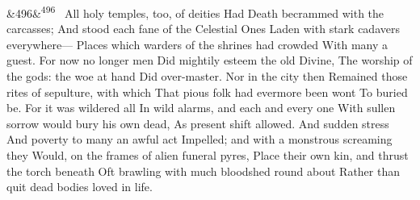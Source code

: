 \documentclass[12pt]{article}
\newcommand{\para}[1][]{\par\noindent\ifx&#1&\else\textsuperscript{\footnotesize #1}~\fi}
\begin{document}
\para[496] All holy temples, too, of deities Had Death becrammed with the carcasses; And stood each fane of the Celestial Ones Laden with stark cadavers everywhere--- Places which warders of the shrines had crowded With many a guest. For now no longer men Did mightily esteem the old Divine, The worship of the gods: the woe at hand Did over-master. Nor in the city then Remained those rites of sepulture, with which That pious folk had evermore been wont To buried be. For it was wildered all In wild alarms, and each and every one With sullen sorrow would bury his own dead, As present shift allowed. And sudden stress And poverty to many an awful act Impelled; and with a monstrous screaming they Would, on the frames of alien funeral pyres, Place their own kin, and thrust the torch beneath Oft brawling with much bloodshed round about Rather than quit dead bodies loved in life.

\end{document}
